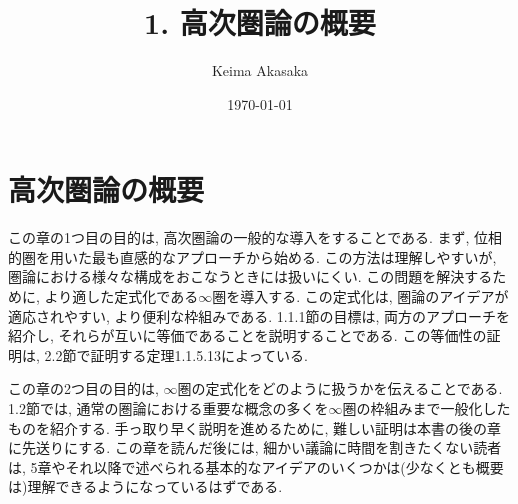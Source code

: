 \documentclass[uplatex, a4paper, 14Q, dvipdfmx]{jsreport}
\title{1. 高次圏論の概要}
\author{Keima Akasaka}
\date{\today}
\begin{document}

\chapter{高次圏論の概要}

この章の1つ目の目的は, 高次圏論の一般的な導入をすることである. 
まず, 位相的圏を用いた最も直感的なアプローチから始める. 
この方法は理解しやすいが, 圏論における様々な構成をおこなうときには扱いにくい. 
この問題を解決するために, より適した定式化である$\infty$圏を導入する. 
この定式化は, 圏論のアイデアが適応されやすい, より便利な枠組みである. 
1.1.1節の目標は, 両方のアプローチを紹介し, それらが互いに等価であることを説明することである. 
この等価性の証明は, 2.2節で証明する定理1.1.5.13によっている. 

この章の2つ目の目的は, $\infty$圏の定式化をどのように扱うかを伝えることである. 
1.2節では, 通常の圏論における重要な概念の多くを$\infty$圏の枠組みまで一般化したものを紹介する.
手っ取り早く説明を進めるために, 難しい証明は本書の後の章に先送りにする. 
この章を読んだ後には, 細かい議論に時間を割きたくない読者は, 5章やそれ以降で述べられる基本的なアイデアのいくつかは(少なくとも概要は)理解できるようになっているはずである. 
\end{document}
